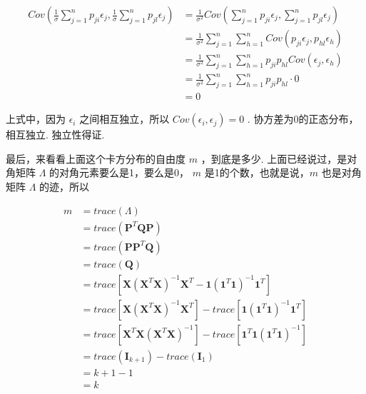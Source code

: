 \documentclass[UTF8]{ctexart}
\begin{document}
    \begin{equation}
    	\begin{aligned}
    	    Cov(\frac{1}{\sigma} \sum_{j=1}^{n}{p_{ji} \epsilon_{j}}, \frac{1}{\sigma} \sum_{j=1}^{n}{p_{jl} \epsilon_{j}}) & = \frac{1}{\sigma^2} Cov(\sum_{j=1}^{n}{p_{ji} \epsilon_{j}}, \sum_{j=1}^{n}{p_{jl} \epsilon_{j}}) \\
    	    & = \frac{1}{\sigma^2} \sum_{j=1}^{n} \sum_{h=1}^{n} Cov(p_{ji} \epsilon_{j}, p_{hl} \epsilon_{h}) \\
    	    & = \frac{1}{\sigma^2} \sum_{j=1}^{n} \sum_{h=1}^{n} p_{ji} p_{hl} Cov(\epsilon_{j}, \epsilon_{h}) \\
    	    & = \frac{1}{\sigma^2} \sum_{j=1}^{n} \sum_{h=1}^{n} p_{ji} p_{hl} \cdot 0 \\
    	    & = 0
    	\end{aligned}
    \end{equation}

    上式中，因为 $ \epsilon_i $ 之间相互独立，所以 $ Cov(\epsilon_i, \epsilon_j) = 0 $ . 协方差为0的正态分布，相互独立. 独立性得证. 

    最后，来看看上面这个卡方分布的自由度 $ m $ ，到底是多少. 上面已经说过，是对角矩阵 $ \boldsymbol{\varLambda} $ 的对角元素要么是1，要么是0， $ m $  是1的个数，也就是说，$ m $ 也是对角矩阵 $ \boldsymbol{\varLambda} $ 的迹，所以
    
    \begin{equation}
        \begin{aligned}
            m & = trace(\boldsymbol{\varLambda}) \\
            & = trace(\boldsymbol{P}^T \boldsymbol{Q} \boldsymbol{P}) \\
            & = trace(\boldsymbol{P} \boldsymbol{P}^T \boldsymbol{Q}) \\
            & = trace(\boldsymbol{Q}) \\
            & = trace[\boldsymbol{X} (\boldsymbol{X}^T \boldsymbol{X})^{-1} \boldsymbol{X}^T - \boldsymbol{1}  (\boldsymbol{1}^T \boldsymbol{1})^{-1} \boldsymbol{1}^T] \\
            & = trace[\boldsymbol{X} (\boldsymbol{X}^T \boldsymbol{X})^{-1} \boldsymbol{X}^T] - trace[\boldsymbol{1}  (\boldsymbol{1}^T \boldsymbol{1})^{-1} \boldsymbol{1}^T] \\
            & = trace[\boldsymbol{X}^T \boldsymbol{X} (\boldsymbol{X}^T \boldsymbol{X})^{-1}] - trace[\boldsymbol{1}^T \boldsymbol{1} (\boldsymbol{1}^T \boldsymbol{1})^{-1}] \\
            & = trace(\boldsymbol{I}_{k + 1}) - trace(\boldsymbol{I}_1) \\
            & = k + 1 - 1 \\
            & = k
        \end{aligned}
    \end{equation}
\end{document}
